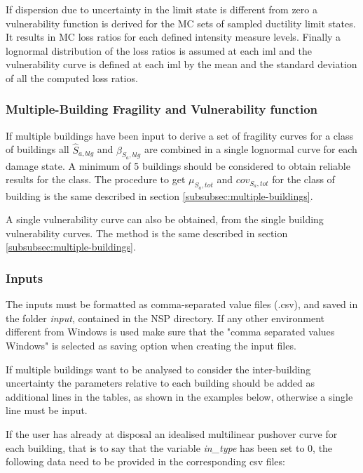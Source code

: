 If dispersion due to uncertainty in the limit state is different from zero a vulnerability function is derived for the MC sets of sampled ductility limit states. It results in MC loss ratios for each defined intensity measure levels. Finally a lognormal distribution of the loss ratios is assumed at each iml and the vulnerability curve is defined at each iml by the mean and the standard deviation of all the computed loss ratios.

\subsubsection{Multiple-Building Fragility and Vulnerability function}
\label{subsubsec:multiple-building-spo2ida}
If multiple buildings have been input to derive a set of fragility curves for a class of buildings all $\hat{S}_{a,blg}$ and $\beta_{S_a,blg}$ are combined in a single lognormal curve for each damage state. A minimum of 5 buildings should be considered to obtain reliable results for the class. The procedure to get $\mu_{S_a,tot}$ and $cov_{S_a,tot}$ for the class of building is the same described in section \ref{subsubsec:multiple-buildings}.

A single vulnerability curve can also be obtained, from the single building vulnerability curves. The method is the same described in section \ref{subsubsec:multiple-buildings}.

\subsubsection{Inputs}
\label{subsubsec:InputSpo2ida}
The inputs must be formatted as comma-separated value files (.csv), and saved in the folder \textit{input}, contained in the NSP directory. If any other environment different from Windows is used make sure that the "comma separated values Windows" is selected as saving option when creating the input files. 

If multiple buildings want to be analysed to consider the inter-building uncertainty the parameters relative to each building should be added as additional lines in the tables, as shown in the examples below, otherwise a single line must be input.

If the user has already at disposal an idealised multilinear pushover curve for each building, that is to say that the variable \textit{in\_type} has been set to 0, the following data need to be provided in the corresponding csv files:

